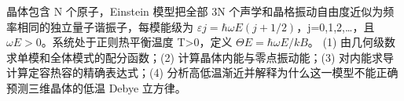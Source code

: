 晶体包含 N 个原子，Einstein 模型把全部 3N 个声学和晶格振动自由度近似为频率相同的独立量子谐振子，每模能级为 \(\varepsilon j=\hbar \omega E(j+1/2)\)，j=0,1,2,…，且 \(\omega E>0\)。系统处于正则热平衡温度 T>0，定义 \(\Theta E=\hbar \omega E/kB\)。
(1) 由几何级数求单模和全体模式的配分函数；(2) 计算晶体内能与零点振动能；(3) 对内能求导计算定容热容的精确表达式；(4) 分析高低温渐近并解释为什么这一模型不能正确预测三维晶体的低温 Debye 立方律。

